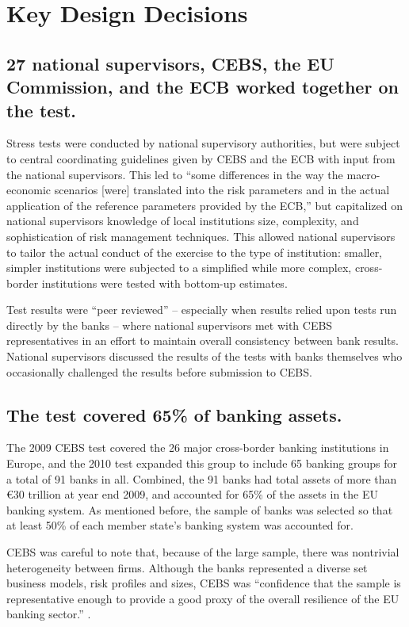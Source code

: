 \documentclass[12pt]{article}
\begin{document}
\section{Key Design Decisions}\label{keydesign}

\subsection{27 national supervisors, CEBS, the EU Commission, and the ECB worked together on the test.}

Stress tests were conducted by national supervisory authorities, but were subject to central coordinating guidelines given by CEBS and the ECB with input from the national supervisors. This led to ``some differences in the way the macro-economic scenarios [were] translated into the risk parameters and in the actual application of the reference parameters provided by the ECB,'' but capitalized on national supervisors knowledge of local institutions size, complexity, and sophistication of risk management techniques. This allowed national supervisors to tailor the actual conduct of the exercise to the type of institution: smaller, simpler institutions were subjected to a simplified while more complex, cross-border institutions were tested with bottom-up estimates.

Test results were  ``peer reviewed'' -- especially when results relied upon tests run directly by the banks -- where national supervisors met with CEBS representatives in an effort to maintain overall consistency between bank results. National supervisors  discussed the results of the tests with banks themselves who occasionally challenged the results before submission to CEBS. \citep{Methodology}

\subsection{The test covered 65\% of banking assets.}

The 2009 CEBS test covered the 26 major cross-border banking institutions in Europe, and the 2010 test expanded this group to include 65 banking groups for a total of 91 banks in all. Combined, the 91 banks had total assets of more than \euro{30} trillion at year end 2009, and accounted for 65\% of the assets in the EU banking system. As mentioned before, the sample of banks was selected so that at least 50\% of each member state's banking system was accounted for.

CEBS was careful to note that, because of the large sample, there was nontrivial heterogeneity between firms. Although the banks represented a diverse set business models, risk profiles and sizes, CEBS was ``confidence that the sample is representative enough to provide a good proxy of the overall resilience of the EU banking sector.'' \citep{Methodology}.
\end{document}

